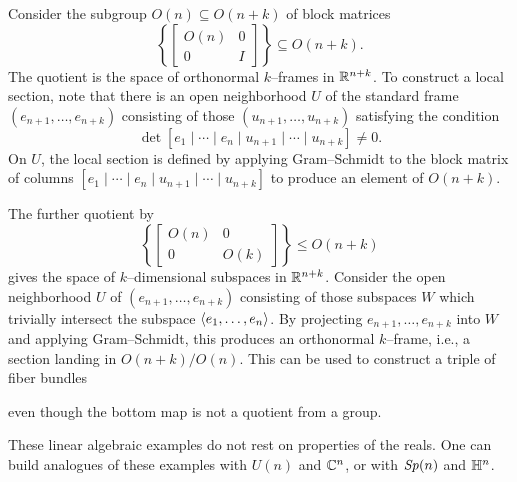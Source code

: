\begin{example}
Consider the subgroup $O(n) \subseteq O(n+k)$ of block matrices \[\left\{\left[\begin{array}{c|c} O(n) & 0 \\ \hline 0 & I \end{array} \right]\right\} \subseteq O(n+k).\]
The quotient is the space of orthonormal $k$--frames in $\mathbb R^{n+k}$.
To construct a local section, note that there is an open neighborhood $U$ of the standard frame $(e_{n+1}, \ldots, e_{n+k})$ consisting of those $(u_{n+1}, \ldots, u_{n+k})$ satisfying the condition \[\det\left[e_1 \mid \cdots \mid e_n \mid u_{n+1} \mid \cdots \mid u_{n+k}\right] \ne 0.\]
On $U$, the local section is defined by applying Gram--Schmidt to the block matrix of columns $[e_1 \mid \cdots \mid e_n \mid u_{n+1} \mid \cdots \mid u_{n+k}]$ to produce an element of $O(n+k)$.
\end{example}

\begin{example}[Grassmannians]\label{GrassmanniansAreFiberBundles}%
The further quotient by \[\left\{ \left[ \begin{array}{c|c} O(n) & 0 \\ \hline 0 & O(k) \end{array} \right] \right\} \le O(n+k)\] gives the space of $k$--dimensional subspaces in $\mathbb R^{n+k}$.
Consider the open neighborhood $U$ of $(e_{n+1}, \ldots, e_{n+k})$ consisting of those subspaces $W$ which trivially intersect the subspace $\langle e_1, \ldots, e_n\rangle$.
By projecting $e_{n+1}, \ldots, e_{n+k}$ into $W$ and applying Gram--Schmidt, this produces an orthonormal $k$--frame, i.e., a section landing in $O(n+k) / O(n)$.
This can be used to construct a triple of fiber bundles
\begin{center}
\end{center}
even though the bottom map is not a quotient from a group.
\end{example}

\begin{example}
These linear algebraic examples do not rest on properties of the reals.
One can build analogues of these examples with $U(n)$ and $\mathbb C^n$, or with $\mathit{Sp}(n)$ and $\mathbb H^n$.
\end{example}

